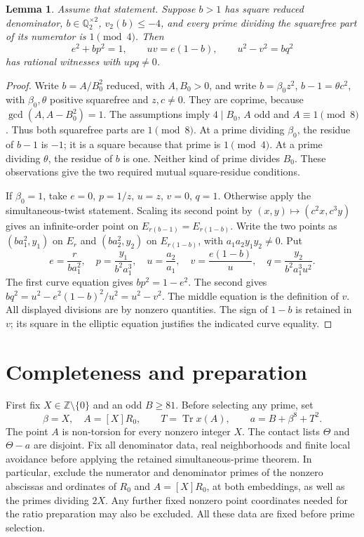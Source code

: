\documentclass[11pt,a4paper]{article}
\newtheorem{lemma}[theorem]{Lemma}
\newcommand{\Q}{\mathbb Q}\newcommand{\Z}{\mathbb Z}
\DeclareMathOperator{\Tr}{Tr}\DeclareMathOperator{\Nm}{Nm}
\begin{document}
\begin{lemma}\label{lem:largepole}
Assume that statement. Suppose $b>1$ has square reduced denominator,
$b\in\Q_2^{\times2}$, $v_2(b)\le-4$, and every prime dividing
the squarefree part of its numerator is $1\pmod4$.
Then
\[
 e^2+bp^2=1,\qquad uv=e(1-b),\qquad u^2-v^2=bq^2
\]
has rational witnesses with $upq\ne0$.
\end{lemma}
\begin{proof}
Write $b=A/B_0^2$ reduced, with $A,B_0>0$, and write
$b=\beta_0 z^2$, $b-1=\theta c^2$, with $\beta_0,\theta$
positive squarefree and $z,c\ne0$. They are coprime, because
$\gcd(A,A-B_0^2)=1$.
The assumptions imply $4\mid B_0$, $A$ odd and $A\equiv1\pmod8$.
Thus both squarefree parts are $1\pmod8$.
At a prime dividing $\beta_0$, the residue of $b-1$ is $-1$;
it is a square because that prime is $1\pmod4$.
At a prime dividing $\theta$, the residue of $b$ is one.
Neither kind of prime divides $B_0$. These observations give the
two required mutual square-residue conditions.

If $\beta_0=1$, take $e=0$, $p=1/z$, $u=z$, $v=0$, $q=1$.
Otherwise apply the simultaneous-twist statement. Scaling its second
point by $(x,y)\mapsto(c^2x,c^3y)$ gives an infinite-order point
on $E_{r(b-1)}=E_{r(1-b)}$. Write the two points as
$(ba_1^2,y_1)$ on $E_r$ and $(ba_2^2,y_2)$ on $E_{r(1-b)}$,
with $a_1a_2y_1y_2\ne0$. Put
\[
 e=\frac{r}{ba_1^2},\quad p=\frac{y_1}{b^2a_1^3},\quad
 u=\frac{a_2}{a_1},\quad v=\frac{e(1-b)}u,\quad
 q=\frac{y_2}{b^2a_1^3u^2}.
\]
The first curve equation gives $bp^2=1-e^2$.
The second gives $bq^2=u^2-e^2(1-b)^2/u^2=u^2-v^2$.
The middle equation is the definition of $v$.
All displayed divisions are by nonzero quantities. The sign of
$1-b$ is retained in $v$; its square in the elliptic equation
justifies the indicated curve equality.
\end{proof}

\section{Completeness and preparation}\label{sec:completeness}
First fix $X\in\Z\setminus\{0\}$ and an odd $B\ge81$.
Before selecting any prime, set
\[
 \beta=X,\quad A=[X]R_0,\qquad
 T=\Tr x(A),\qquad a=B+\beta^8+T^2.
\]
The point $A$ is non-torsion for every nonzero integer $X$.
The contact lists $\Theta$ and $\Theta-a$ are disjoint.
Fix all denominator data, real neighborhoods and finite local
avoidance before applying the retained simultaneous-prime theorem.
In particular, exclude the numerator and denominator primes of the
nonzero abscissas and ordinates of $R_0$ and $A=[X]R_0$, at both embeddings,
as well as the primes dividing $2X$. Any further fixed nonzero
point coordinates needed for the ratio preparation may also be excluded.
All these data are fixed before prime selection.
\end{document}
